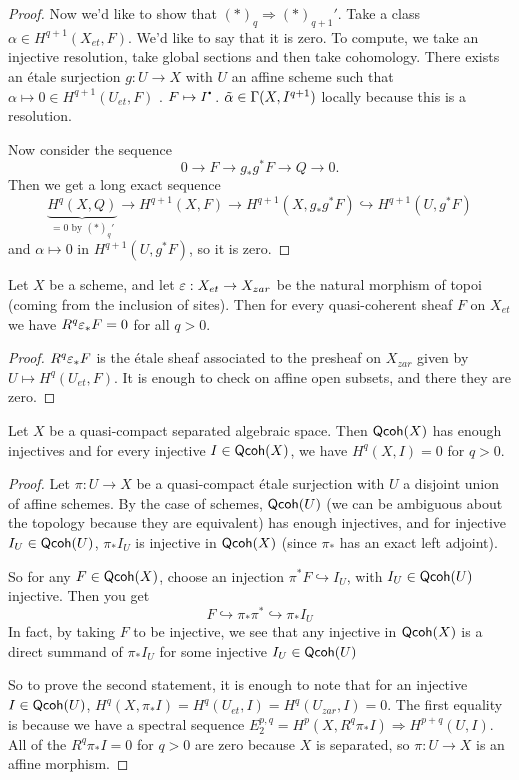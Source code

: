\begin{proof}
   Now we'd like to show that $(*)_q\Rightarrow (*)_{q+1}'$. Take a class $\alpha\in
   H^{q+1}(X_{et},F)$. We'd like to say that it is zero. To compute, we take an injective
   resolution, take global sections and then take cohomology. There exists an \'etale
   surjection $g:U\to X$ with $U$ an affine scheme such that $\alpha\mapsto 0\in
   H^{q+1}(U_{et},F)$ . $F\mapsto
   I^\udot$. $\tilde \alpha\in \Gamma(X,I^{q+1})$ locally because this is a resolution.

   Now consider the sequence
   \[
    0\to F \to g_*g^* F\to Q\to 0.
   \]
   Then we get a long exact sequence
   \[
    \underbrace{H^q(X,Q)}_{=0\text{ by }(*)_q'}\to H^{q+1}(X,F)\to H^{q+1}(X,g_*g^*F)
    \hookrightarrow H^{q+1}(U,g^*F)
   \]
   and $\alpha\mapsto 0$ in $H^{q+1}(U,g^*F)$, so it is zero.
 \end{proof}
 \begin{lemma}
   Let $X$ be a scheme, and let $\varepsilon:X_{et}\to X_{zar}$ be the natural morphism of topoi
   (coming from the inclusion of sites). Then for every quasi-coherent sheaf $F$ on
   $X_{et}$ we have $R^q\varepsilon_*F=0$ for all $q>0$.
 \end{lemma}
 \begin{proof}
   $R^q\varepsilon_*F$ is the \'etale sheaf associated to the presheaf on $X_{zar}$ given by
   $U\mapsto H^q(U_{et},F)$. It is enough to check on affine open subsets, and there they
   are zero.
 \end{proof}
 \begin{lemma}
   Let $X$ be a quasi-compact separated algebraic space. Then $\text{\sf Qcoh}(X)$ has enough
   injectives and for every injective $I\in \text{\sf Qcoh}(X)$, we have $H^q(X,I)=0$ for $q>0$.
 \end{lemma}
 \begin{proof}
   Let $\pi:U\to X$ be a quasi-compact \'etale surjection with $U$ a disjoint union of
   affine schemes. By the case of schemes, $\text{\sf Qcoh}(U)$ (we can be ambiguous about the
   topology because they are equivalent) has enough injectives, and for injective $I_U\in
   \text{\sf Qcoh}(U)$, $\pi_*I_U$ is injective in $\text{\sf Qcoh}(X)$ (since $\pi_*$ has an exact left
   adjoint).

   So for any $F\in \text{\sf Qcoh}(X)$, choose an injection $\pi^*F\hookrightarrow I_U$, with
   $I_U\in \text{\sf Qcoh}(U)$ injective. Then you get
   \[
    F\hookrightarrow \pi_*\pi^* \hookrightarrow \pi_*I_U
   \]
   In fact, by taking $F$ to be injective, we see that any injective in $\text{\sf Qcoh}(X)$ is a
   direct summand of $\pi_*I_U$ for some injective $I_U\in \text{\sf Qcoh}(U)$

   So to prove the second statement, it is enough to note that for an injective $I\in
   \text{\sf Qcoh}(U)$, $H^q(X,\pi_*I)=H^q(U_{et},I)=H^q(U_{zar},I)=0$. The first equality is
   because we have a spectral sequence $E_2^{p,q}=H^p(X,R^q\pi_* I)\Rightarrow
   H^{p+q}(U,I)$. All of the $R^q\pi_*I=0$ for $q>0$ are zero because $X$ is separated,
   so $\pi:U\to X$ is an affine morphism.
 \end{proof}
